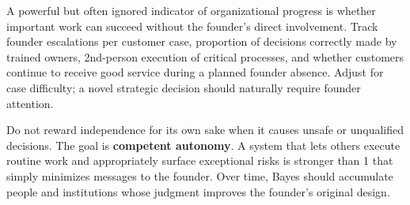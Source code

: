 A powerful but often ignored indicator of organizational progress is whether important work can succeed without the founder's direct involvement. Track founder escalations per customer case, proportion of decisions correctly made by trained owners, 2nd-person execution of critical processes, and whether customers continue to receive good service during a planned founder absence. Adjust for case difficulty; a novel strategic decision should naturally require founder attention.

Do not reward independence for its own sake when it causes unsafe or unqualified decisions. The goal is \textbf{competent autonomy}. A system that lets others execute routine work and appropriately surface exceptional risks is stronger than 1 that simply minimizes messages to the founder. Over time, Bayes should accumulate people and institutions whose judgment improves the founder's original design.
